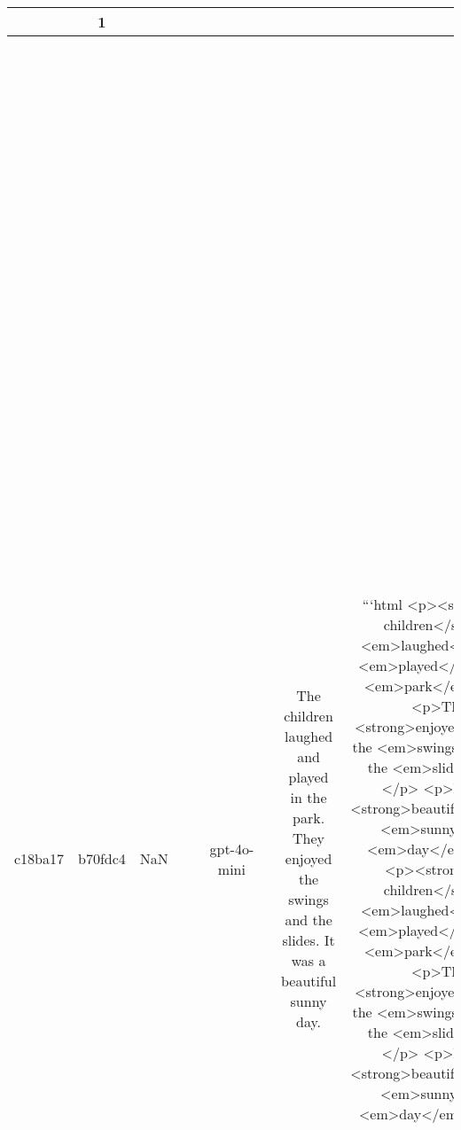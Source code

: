 \begin{table}[h!]
\begin{tabular}{|c|c|c|c|c|c|c|c|c|c|}
{{Given these points, the output does not follow the guideline for including both a `<strong>` and multiple `<em>` tags within each `<p>` tag.

ERR & 1\\
\hline
c18ba17 & b70fdc4 & NaN &  & gpt-4o-mini & The children laughed and played in the park. They enjoyed the swings and the slides. It was a beautiful sunny day. & ```html
<p><strong>The children</strong> <em>laughed</em> and <em>played</em> in the <em>park</em>.</p>
<p>They <strong>enjoyed</strong> the <em>swings</em> and the <em>slides</em>.</p>
<p>It was a <strong>beautiful</strong> <em>sunny</em> <em>day</em>.</p>
<p><strong>The children</strong> <em>laughed</em> and <em>played</em> in the <em>park</em>.</p>
<p>They <strong>enjoyed</strong> the <em>swings</em> and the <em>slides</em>.</p>
<p>It was a <strong>beautiful</strong> <em>sunny</em> <em>day</em>.</p>
``` & ok & The chatbot's output consists of HTML where each sentence is wrapped in a `<p>` tag, with a `<strong>` tag and multiple `<em>` tags inside each `<p>` to highlight key words and phrases. The output contains six `<p>` tags, which complies with the rule that there should be at least three `<p>` tags.

Each `<p>` tag contains at least one `<strong>` tag and multiple `<em>` tags, which is in accordance with the description instructions. Given that the number of tags and their usage meet the criterion outlined in the description, this output complies with the chatbot's instructions.

All these details align with the direct and explicit requirements provided in the description. Hence, based on the available output, the requirements are satisfied without any violations.

No violation.
OK & 1\\
\hline
c18ba17 & b70fdc4 & NaN &  & gemma2:9b & The children laughed and played in the park. They enjoyed the swings and the slides. It was a beautiful sunny day. & Here's the formatted HTML paragraph:

<p><strong>The</strong> <em>children</em> laughed and played in the <strong>park</strong>.</p>
<p>They enjoyed the <em>swings</em> and the <em>slides</em>.</p>
<p>It was a <em>beautiful</em> <em>sunny</em> day.</p> 


Let me know if you'd like to experiment with other formatting options! & ok & The chatbot's output complies with the description in several key aspects:

1. The paragraph has been split into individual sentences, each wrapped in a `<p>` tag. There are three `<p>` tags present, which meets the requirement of having at least three `<p>` tags.

}}
\end{tabular}
\end{table}
